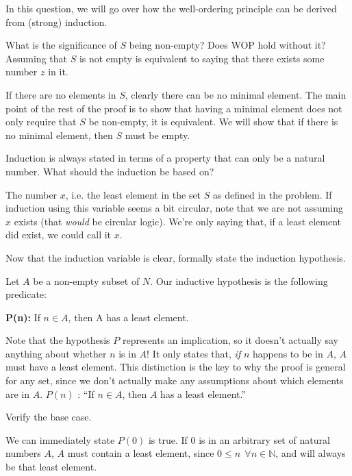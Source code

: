 \question In this question, we will go over how the well-ordering principle can 
be derived from (strong) induction. 

\begin{questions}
\item What is the significance of $S$ being non-empty? Does WOP hold 
without it? Assuming that $S$ is not empty is equivalent to saying that 
there exists some number $z$ in it.
\begin{solution}[0.5 in]
If there are no elements in $S$, clearly there can be no minimal 
element. The main point of the rest of the proof is to show that 
having a minimal element does not only require that $S$ be non-empty, 
it is equivalent. We will show that if there is no minimal element, 
then $S$ must be empty.
\end{solution}

\item Induction is always stated in terms of a property that can only 
be a natural number. What should the induction be based on?
\begin{solution}[0.4 in]
The number $x$, i.e. the least element in the set $S$ as defined in 
the problem. If induction using this variable seems a bit circular, 
note that we are not assuming $x$ exists (that \emph{would} be 
circular logic). We're only saying that, if a least element did exist, 
we could call it $x$. 
\end{solution}

\item Now that the induction variable is clear, formally state the 
induction hypothesis.
\begin{solution}[0.5 in]
Let $A$ be a non-empty subset of $N$. Our inductive hypothesis is 
the following predicate: 

\textbf{P(n):} If $n \in A$, then A has a least element.

Note that the hypothesis $P$ represents an implication, so it doesn't 
actually say anything about whether $n$ is in $A$! It only states that, 
\emph{if} $n$ happens to be in $A$, $A$ must have a least element. This 
distinction is the key to why the proof is general for any set, since 
we don't actually make any assumptions about which elements are in $A$.
$P(n)$ : “If $n \in A$, then $A$ has a least element.”
\end{solution}

\item Verify the base case.
\begin{solution}[.7 in]
We can immediately state $P(0)$ is true. If $0$ is in an arbitrary set 
of natural numbers $A$, $A$ must contain a least element, since $0 
\leq n \: \: \forall n \in \mathbb{N}$, and will always be that least element.
\end{solution}


\end{questions}
